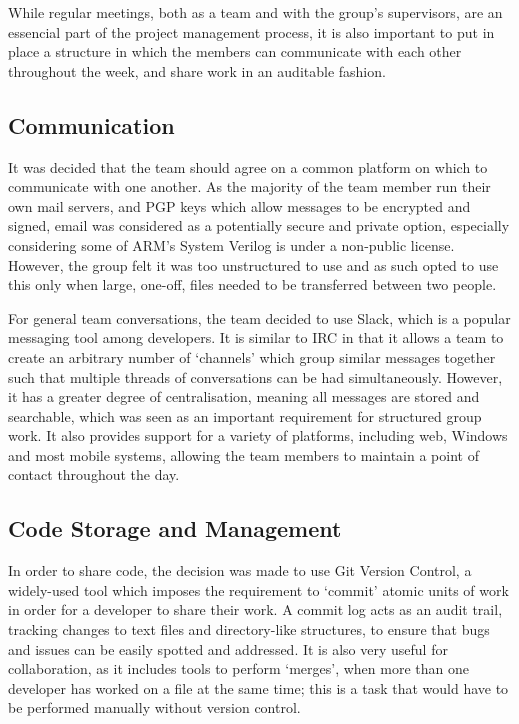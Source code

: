 
While regular meetings, both as a team and with the group's supervisors, are an essencial part of the project management process, it is also important to put in place a structure in which the members can communicate with each other throughout the week, and share work in an auditable fashion.

\subsection{Communication}
It was decided that the team should agree on a common platform on which to communicate with one another. As the majority of the team member run their own mail servers, and PGP keys which allow messages to be encrypted and signed, email was considered as a potentially secure and private option, especially considering some of ARM's System Verilog is under a non-public license. However, the group felt it was too unstructured to use and as such opted to use this only when large, one-off, files needed to be transferred between two people.

For general team conversations, the team decided to use Slack, which is a popular messaging tool among developers. It is similar to IRC in that it allows a team to create an arbitrary number of `channels' which group similar messages together such that multiple threads of conversations can be had simultaneously. However, it has a greater degree of centralisation, meaning all messages are stored and searchable, which was seen as an important requirement for structured group work. It also provides support for a variety of platforms, including web, Windows and most mobile systems, allowing the team members to maintain a point of contact throughout the day.

\subsection{Code Storage and Management}
In order to share code, the decision was made to use Git Version Control, a widely-used tool which imposes the requirement to `commit' atomic units of work in order for a developer to share their work. A commit log acts as an audit trail, tracking changes to text files and directory-like structures, to ensure that bugs and issues can be easily spotted and addressed. It is also very useful for collaboration, as it includes tools to perform `merges', when more than one developer has worked on a file at the same time; this is a task that would have to be performed manually without version control.

